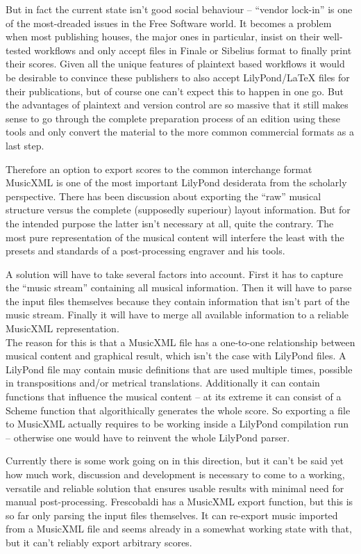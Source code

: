 \documentclass[oneside]{OLLbook}
\begin{document}
But in fact the current state isn't good social behaviour -- “vendor lock-in” is one of the most-dreaded issues in the Free Software world.
It becomes a problem when most publishing houses, the major ones in particular, insist on their well-tested workflows and only accept files in Finale or Sibelius format to finally print their scores.
Given all the unique features of plaintext based workflows it would be desirable to convince these publishers to also accept LilyPond/\LaTeX{} files for their publications, but of course one can't expect this to happen in one go.
But the advantages of plaintext and version control are so massive that it still makes sense to go through the complete preparation process of an edition using these tools and only convert the material to the more common commercial formats as a last step.

Therefore an option to export scores to the common interchange format MusicXML is one of the most important LilyPond desiderata from the scholarly perspective.
There has been discussion about exporting the “raw” musical structure versus the complete (supposedly superiour) layout information.
But for the intended purpose the latter isn't necessary at all, quite the contrary.
The most pure representation of the musical content will interfere the least with the presets and standards of a post-processing engraver and his tools.

A solution will have to take several factors into account.
First it has to capture the “music stream” containing all musical information.
Then it will have to parse the input files themselves because they contain information that isn't part of the music stream.
Finally it will have to merge all available information to a reliable MusicXML representation.\\
The reason for this is that a MusicXML file has a one-to-one relationship between musical content and graphical result, which isn't the case with LilyPond files.
A LilyPond file may contain music definitions that are used multiple times, possible in transpositions and/or metrical translations.
Additionally it can contain functions that influence the musical content -- at its extreme it can consist of a Scheme function that algorithically generates the whole score.
So exporting a file to MusicXML actually requires to be working inside a LilyPond compilation run -- otherwise one would have to reinvent the whole LilyPond parser.

Currently there is some work going on in this direction, but it can't be said yet how much work, discussion and development is necessary to come to a working, versatile and reliable solution that ensures usable results with minimal need for manual post-processing.
Frescobaldi has a MusicXML export function, but this is so far only parsing the input files themselves. It can re-export music imported from a MusicXML file and seems already in a somewhat working state with that, but it can't reliably export arbitrary scores.
\end{document}
